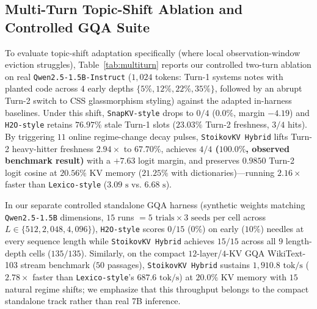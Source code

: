 \documentclass[conference]{IEEEtran}
\begin{document}
\subsection{Multi-Turn Topic-Shift Ablation and Controlled GQA Suite}
To evaluate topic-shift adaptation specifically (where local observation-window eviction struggles), Table~\ref{tab:multiturn} reports our controlled two-turn ablation on real \texttt{Qwen2.5-1.5B-Instruct} ($1{,}024$ tokens: Turn-1 systems notes with planted code across $4$ early depths $\{5\%, 12\%, 22\%, 35\%\}$, followed by an abrupt Turn-2 switch to CSS glassmorphism styling) against the adapted in-harness baselines. Under this shift, \texttt{SnapKV-style} drops to $0/4$ ($0.0\%$, margin $-4.19$) and \texttt{H2O-style} retains $76.97\%$ stale Turn-1 slots ($23.03\%$ Turn-2 freshness, $3/4$ hits). By triggering $11$ online regime-change decay pulses, \texttt{StoikovKV Hybrid} lifts Turn-2 heavy-hitter freshness $2.94\times$ to \textbf{$67.70\%$}, achieves \textbf{$4/4$ ($100.0\%$, observed benchmark result)} with a $+7.63$ logit margin, and preserves $0.9850$ Turn-2 logit cosine at $20.56\%$ KV memory ($21.25\%$ with dictionaries)---running $2.16\times$ faster than \texttt{Lexico-style} ($3.09\text{ s}$ vs. $6.68\text{ s}$).

In our separate controlled standalone GQA harness (synthetic weights matching \texttt{Qwen2.5-1.5B} dimensions, $15$ runs $= 5\text{ trials} \times 3\text{ seeds}$ per cell across $L \in \{512, 2{,}048, 4{,}096\}$), \texttt{H2O-style} scores $0/15$ ($0\%$) on early ($10\%$) needles at every sequence length while \texttt{StoikovKV Hybrid} achieves $15/15$ across all $9$ length-depth cells ($135/135$). Similarly, on the compact $12$-layer/$4$-KV GQA WikiText-103 stream benchmark ($50$ passages), \texttt{StoikovKV Hybrid} sustains $1{,}910.8\text{ tok/s}$ ($2.78\times$ faster than \texttt{Lexico-style}'s $687.6\text{ tok/s}$) at $20.0\%$ KV memory with $15$ natural regime shifts; we emphasize that this throughput belongs to the compact standalone track rather than real 7B inference.
\end{document}
